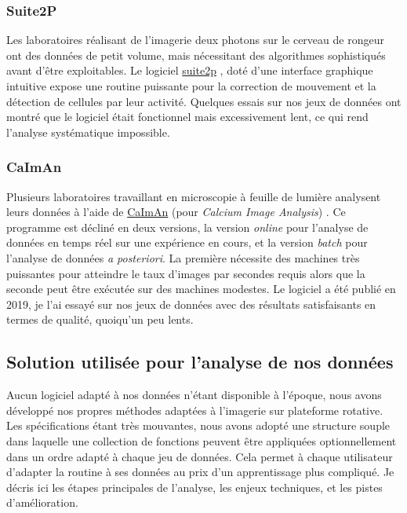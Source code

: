 \subsubsection{Suite2P}

Les laboratoires réalisant de l'imagerie deux photons sur le cerveau de rongeur ont des données de petit volume, mais nécessitant des algorithmes sophistiqués avant d'être exploitables. Le logiciel \href{https://www.suite2p.org/}{suite2p} \cite{pachitariu_suite2p_2016}, doté d'une interface graphique intuitive expose une routine puissante pour la correction de mouvement et la détection de cellules par leur activité. Quelques essais sur nos jeux de données ont montré que le logiciel était fonctionnel mais excessivement lent, ce qui rend l'analyse systématique impossible.

\subsubsection{CaImAn}

Plusieurs laboratoires travaillant en microscopie à feuille de lumière analysent leurs données à l'aide de \href{https://github.com/flatironinstitute/CaImAn}{CaImAn} (pour \emph{Calcium Image Analysis}) \cite{giovannucci_caiman_2019}. Ce programme est décliné en deux versions, la version \emph{online} pour l'analyse de données en temps réel sur une expérience en cours, et la version \emph{batch} pour l'analyse de données \emph{a posteriori}. La première nécessite des machines très puissantes pour atteindre le taux d'images par secondes requis alors que la seconde peut être exécutée sur des machines modestes. Le logiciel a été publié en 2019, je l'ai essayé sur nos jeux de données avec des résultats satisfaisants en termes de qualité, quoiqu'un peu lents.

\subsection{Solution utilisée pour l'analyse de nos données}


Aucun logiciel adapté à nos données n'étant disponible à l'époque, nous avons développé nos propres méthodes adaptées à l'imagerie sur plateforme rotative. Les spécifications étant très mouvantes, nous avons adopté une structure souple dans laquelle une collection de fonctions peuvent être appliquées optionnellement dans un ordre adapté à chaque jeu de données. Cela permet à chaque utilisateur d'adapter la routine à ses données au prix d'un apprentissage plus compliqué. Je décris ici les étapes principales de l'analyse, les enjeux techniques, et les pistes d'amélioration.

